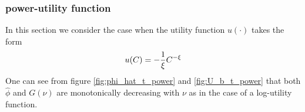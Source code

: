 \documentclass{article}
\begin{document}

\subsubsection{power-utility function}
In this section we consider the case when the utility function
$u(\cdot)$ takes the form
\[
u(C) = -{1 \over \xi} C^{-\xi}
\]
One can see from figure \ref{fig:phi_hat_t_power} and
\ref{fig:U_b_t_power} that both $\hat \phi$ and $G(\nu)$ are monotonically 
decreasing with $\nu$ as in the case of a log-utility function.


\end{document}
